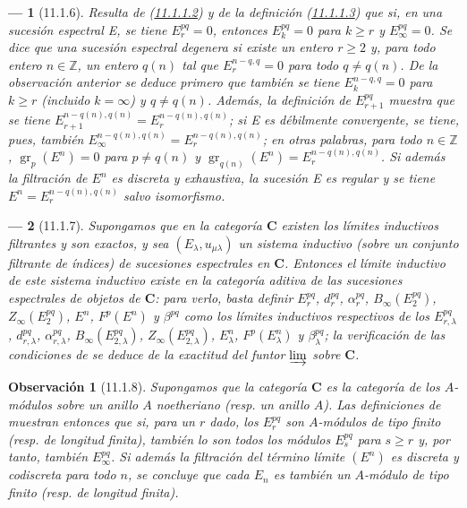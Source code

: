 \documentclass[10pt,oneside,openany]{book}
\theoremstyle{egaenv}\newtheorem*{env}{---}
\theoremstyle{egastatement}
\theoremstyle{egadescription}
\newtheorem*{remark}{Observación}
\renewcommand{\geq}{\geqslant}
\begin{document}
\begin{env}[11.1.6]
\label{0.11.1.6-fr}
Resulta de (\hyperref[0.11.1.1.2-fr]{11.1.1.2}) y de la definición (\hyperref[0.11.1.1.3-fr]{11.1.1.3}) que si, en una sucesión espectral E, se tiene
$E_r^{pq}=0$, entonces $E_k^{pq}=0$ para $k\geq r$ y $E_\infty^{pq}=0$.
Se dice que una sucesión espectral \emph{degenera} si existe un entero $r\geq2$ y, para todo entero $n\in\mathbb Z$, un entero $q(n)$ tal que $E_r^{n-q,q}=0$ \emph{para todo} $q\ne q(n)$.
De la observación anterior se deduce primero que también se tiene $E_k^{n-q,q}=0$ para $k\geq r$ (incluido $k=\infty$) y $q\ne q(n)$.
Además, la definición de $E_{r+1}^{pq}$ muestra que se tiene $E_{r+1}^{n-q(n),q(n)}=E_r^{n-q(n),q(n)}$; si E es \emph{débilmente convergente}, se tiene, pues, también
$E_\infty^{n-q(n),q(n)}=E_r^{n-q(n),q(n)}$; en otras palabras, para todo $n\in\mathbb Z$, $\operatorname{gr}_p(E^n)=0$ para $p\ne q(n)$ y $\operatorname{gr}_{q(n)}(E^n)=E_r^{n-q(n),q(n)}$.
Si además la filtración de $E^n$ es \emph{discreta} y \emph{exhaustiva}, la sucesión E es \emph{regular} y se tiene
$E^n=E_r^{n-q(n),q(n)}$ salvo isomorfismo.
\end{env}

\begin{env}[11.1.7]
\label{0.11.1.7}
\label{0.11.1.7-fr}
Supongamos que en la categoría $\boldsymbol{C}$ existen los límites inductivos filtrantes y son exactos, y sea $(E_\lambda,u_{\mu\lambda})$ un sistema inductivo (sobre un conjunto filtrante de índices) de sucesiones espectrales en $\boldsymbol{C}$.
Entonces el \emph{límite inductivo} de este sistema inductivo existe en la categoría aditiva de las sucesiones espectrales de objetos de $\boldsymbol{C}$: para verlo, basta definir $E_r^{pq}$, $d_r^{pq}$, $\alpha_r^{pq}$, $B_\infty(E_2^{pq})$, $Z_\infty(E_2^{pq})$, $E^n$, $F^p(E^n)$ y $\beta^{pq}$ como los límites inductivos respectivos de los $E_{r,\lambda}^{pq}$, $d_{r,\lambda}^{pq}$, $\alpha_{r,\lambda}^{pq}$, $B_\infty(E_{2,\lambda}^{pq})$, $Z_\infty(E_{2,\lambda}^{pq})$, $E_\lambda^n$, $F^p(E_\lambda^n)$ y $\beta_\lambda^{pq}$; la verificación de las condiciones de  se deduce de la exactitud del funtor $\varinjlim$ sobre $\boldsymbol{C}$.
\end{env}

\begin{remark}[11.1.8]
\label{0.11.1.8}
\label{0.11.1.8-fr}
Supongamos que la categoría $\boldsymbol{C}$ es la categoría de los $A$-módulos sobre un anillo $A$ \emph{noetheriano} (resp. un anillo $A$).
Las definiciones de  muestran entonces que si, para un $r$ dado, los $E_r^{pq}$ son $A$-módulos \emph{de tipo finito} (resp. \emph{de longitud finita}), también lo son todos los módulos $E_s^{pq}$ para $s\geq r$ y, por tanto, también $E_\infty^{pq}$.
Si además la filtración del término límite $(E^n)$ es \emph{discreta} y \emph{codiscreta} para todo $n$, se concluye que cada $E_n$ es también un $A$-módulo \emph{de tipo finito} (resp. \emph{de longitud finita}).
\end{remark}
\end{document}
